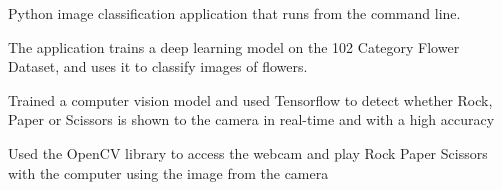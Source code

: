 \documentclass[]{plushcv}
\begin{document}
\begin{minipage}[t]{0.70\textwidth}
\begin{tightemize}
\item Python image classification application that runs from the command line. 
\item The application trains a deep learning model on the 102 Category Flower Dataset, and uses it to classify images of flowers.
\end{tightemize}
\sectionsep

\begin{tightemize}
\item Trained a computer vision model and used Tensorflow to detect whether Rock, Paper or Scissors is shown to the camera in real-time and with a high accuracy
\item Used the OpenCV library to access the webcam and play Rock Paper Scissors with the computer using the image from the camera
\end{tightemize}
\sectionsep


%
%

\end{minipage} 
\hfill
\end{document}
